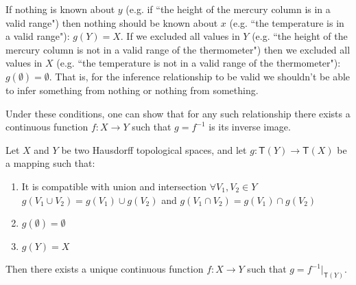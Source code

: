 \documentclass[11pt,letterpaper,fleqn]{memoir} %
\begin{document}
If nothing is known about $y$ (e.g. if ``the height of the mercury column is in a valid range") then nothing should be known about $x$ (e.g. ``the temperature is in a valid range"): $g(Y)=X$. If we excluded all values in $Y$ (e.g. ``the height of the mercury column is not in a valid range of the thermometer") then we excluded all values in $X$ (e.g. ``the temperature is not in a valid range of the thermometer"): $g(\emptyset) = \emptyset$. That is, for the inference relationship to be valid we shouldn't be able to infer something from nothing or nothing from something.

Under these conditions, one can show that for any such relationship there exists a continuous function $f: X \rightarrow Y$ such that $g=f^{-1}$ is its inverse image.

\begin{prop}
	\label{setfunctions}
	Let $X$ and $Y$ be two Hausdorff topological spaces, and let $g: \mathsf{T}(Y) \rightarrow \mathsf{T}(X)$ be a mapping such that:
	\begin{enumerate}
		\item It is compatible with union and intersection $\forall V_1, V_2 \in Y$ $g(V_1 \cup V_2)=g(V_1)\cup g(V_2)$ and $g(V_1 \cap V_2)=g(V_1)\cap g(V_2)$
		\item $g(\emptyset) = \emptyset$
		\item $g(Y) = X$
	\end{enumerate}
	Then there exists a unique continuous function $f: X \rightarrow Y$ such that $g = f^{-1} |_{\mathsf{T}(Y)}$.
\end{prop}
\end{document}

